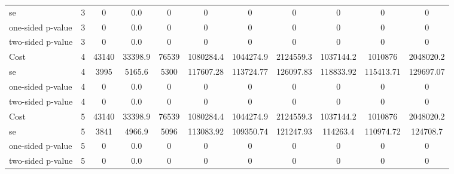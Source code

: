 \begin{tabular}{lcccccccccc}
se 				  &         3 &         0 &       0.0 &         0 & 0 & 0 & 0 & 0 & 0 & 0 \\                                                
one-sided p-value &         3 &         0 &       0.0 &         0 & 0 & 0 & 0 & 0 & 0 & 0 \\                                                
two-sided p-value &         3 &         0 &       0.0 &         0 & 0 & 0 & 0 & 0 & 0 & 0 \\                                                
Cost 			  &         4 &     43140 &   33398.9 &     76539 & 1080284.4 & 1044274.9 & 2124559.3 & 1037144.2 & 1010876 & 2048020.2 \\  
se 				 &          4 &      3995 &    5165.6 &      5300 & 117607.28 & 113724.77 & 126097.83 & 118833.92 & 115413.71 & 129697.07 \\
one-sided p-value&          4 &         0 &       0.0 &         0 & 0 & 0 & 0 & 0 & 0 & 0 \\                                                
two-sided p-value&          4 &         0 &       0.0 &         0 & 0 & 0 & 0 & 0 & 0 & 0 \\                                                
Cost 			  &         5 &     43140 &   33398.9 &     76539 & 1080284.4 & 1044274.9 & 2124559.3 & 1037144.2 & 1010876 & 2048020.2 \\  
se 				 &          5 &      3841 &    4966.9 &      5096 & 113083.92 & 109350.74 & 121247.93 & 114263.4 & 110974.72 & 124708.7 \\  
one-sided p-value&          5 &         0 &       0.0 &         0 & 0 & 0 & 0 & 0 & 0 & 0 \\                                                                                             
two-sided p-value&          5 &         0 &       0.0 &         0 & 0 & 0 & 0 & 0 & 0 & 0 \\  
 \hline \hline \end{tabular}

























